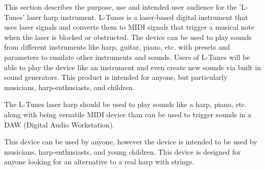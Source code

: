  This section describes the purpose, use and intended user audience for the 'L-Tunes' laser harp instrument. L-Tunes is a laser-based digital instrument that uses laser signals and converts them to MIDI signals that trigger a musical note when the laser is blocked or obstructed. The device can be used to play sounds from different instruments like harp,  guitar, piano, etc. with presets and parameters to emulate other instruments and sounds. Users of L-Tunes will be able to play the device like an instrument and even create new sounds via built in sound generators. This product is intended for anyone, but particularly musicians, harp-enthusiasts, and children.

The L-Tunes laser harp should be used to play sounds like a harp, piano, etc. along with being versatile MIDI device than can be used to trigger sounds in a DAW (Digital Audio Workstation).

This device can be used by anyone,  however the device is intended to be used by musicians,  harp-enthusiasts, and young children. This device is designed for anyone looking for an alternative to a real harp with strings. 
